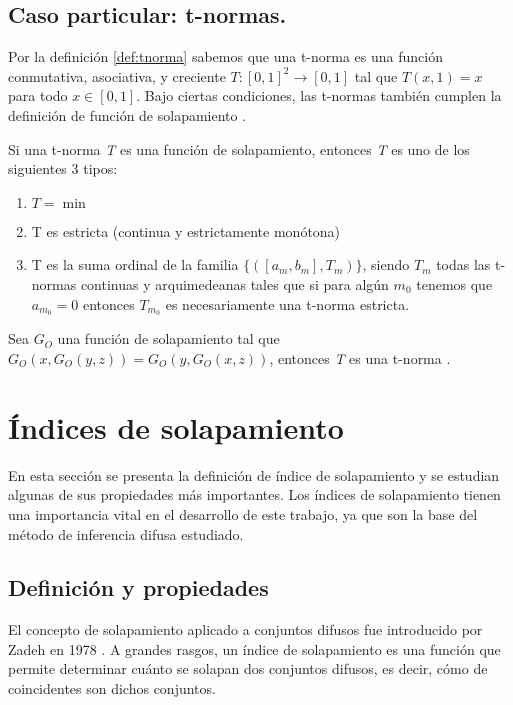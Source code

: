 \subsection{Caso particular: t-normas.}
Por la definición \ref{def:tnorma} sabemos que una t-norma es una función conmutativa, asociativa, y creciente $T:[0,1]^2 \rightarrow [0,1]$ tal que $T(x,1) = x$ para todo $x \in [0,1]$. Bajo ciertas condiciones, las t-normas también cumplen la definición de función de solapamiento \cite{bustince2009overlap}. 
\begin{theorem}
Si una t-norma \emph{T} es una función de solapamiento, entonces \emph{T} es uno de los siguientes 3 tipos:
\begin{enumerate}[label=(\arabic*),ref=(\arabic*)]
	\item $T = \min$
	\item T es estricta (continua y estrictamente monótona)
	\item T es la suma ordinal de la familia $\{([a_{m},b_{m}],T_{m})\}$, siendo $T_{m}$ todas las t-normas continuas y arquimedeanas tales que si para algún $m_{0}$ tenemos que $a_{m_{0}} = 0$ entonces $T_{m_{0}}$ es necesariamente una t-norma estricta.
\end{enumerate}
\end{theorem}
\begin{proposition}
Sea $G_{O}$ una función de solapamiento tal que $G_{O}(x,G_{O}(y,z)) = G_{O}(y,G_{O}(x,z))$, entonces \emph{T} es una t-norma \cite{bustince2013overlap}.
\end{proposition}

\section{Índices de solapamiento}\label{sec:overlap-indexes}
En esta sección se presenta la definición de índice de solapamiento y se estudian algunas de sus propiedades más importantes. Los índices de solapamiento tienen una importancia vital en el desarrollo de este trabajo, ya que son la base del método de inferencia difusa estudiado. 

\subsection{Definición y propiedades}
El concepto de solapamiento aplicado a conjuntos difusos fue introducido por Zadeh en 1978 \cite{zadeh1978}. A grandes rasgos, un índice de solapamiento es una función que permite determinar cuánto se solapan dos conjuntos difusos, es decir, cómo de coincidentes son dichos conjuntos.

